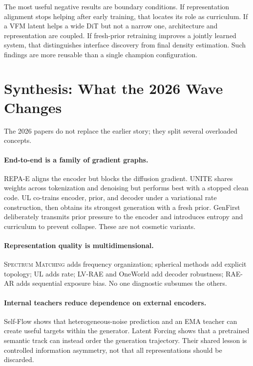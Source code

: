 \documentclass{article}
\newcommand{\method}[1]{\textsc{#1}}
\begin{document}
The most useful negative results are boundary conditions. If representation alignment stops helping after early training, that locates its role as curriculum. If a VFM latent helps a wide DiT but not a narrow one, architecture and representation are coupled. If fresh-prior retraining improves a jointly learned system, that distinguishes interface discovery from final density estimation. Such findings are more reusable than a single champion configuration.

\section{Synthesis: What the 2026 Wave Changes}
\label{sec:synthesis}

The 2026 papers do not replace the earlier story; they split several overloaded concepts.

\paragraph{End-to-end is a family of gradient graphs.}
\method{REPA-E} aligns the encoder but blocks the diffusion gradient. \method{UNITE} shares weights across tokenization and denoising but performs best with a stopped clean code. UL co-trains encoder, prior, and decoder under a variational rate construction, then obtains its strongest generation with a fresh prior. GenFirst deliberately transmits prior pressure to the encoder and introduces entropy and curriculum to prevent collapse. These are not cosmetic variants.

\paragraph{Representation quality is multidimensional.}
\method{Spectrum Matching} adds frequency organization; spherical methods add explicit topology; UL adds rate; \method{LV-RAE} and OneWorld add decoder robustness; \method{RAE-AR} adds sequential exposure bias. No one diagnostic subsumes the others.

\paragraph{Internal teachers reduce dependence on external encoders.}
Self-Flow shows that heterogeneous-noise prediction and an EMA teacher can create useful targets within the generator. Latent Forcing shows that a pretrained semantic track can instead order the generation trajectory. Their shared lesson is controlled information asymmetry, not that all representations should be discarded.
\end{document}
